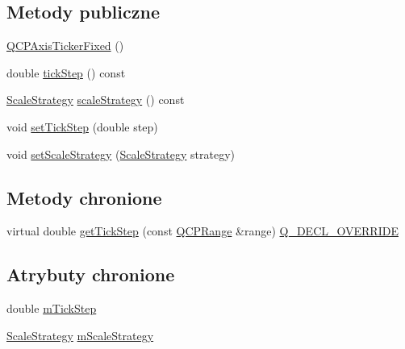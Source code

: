 \subsection*{Metody publiczne}
\begin{DoxyCompactItemize}
\item 
\hyperlink{class_q_c_p_axis_ticker_fixed_a96d2b053a15f9b8e94550c3efeff6a34}{Q\+C\+P\+Axis\+Ticker\+Fixed} ()
\item 
double \hyperlink{class_q_c_p_axis_ticker_fixed_a69e2dbe18a3fbc4108c7ea109fa5d3da}{tick\+Step} () const 
\item 
\hyperlink{class_q_c_p_axis_ticker_fixed_a15b3d38b935d404b1311eb85cfb6a439}{Scale\+Strategy} \hyperlink{class_q_c_p_axis_ticker_fixed_ab9cc237725db85b932dc6f3dd08b93fa}{scale\+Strategy} () const 
\item 
void \hyperlink{class_q_c_p_axis_ticker_fixed_a4bc83d85a4f81d4abdd3fa5042d7b833}{set\+Tick\+Step} (double step)
\item 
void \hyperlink{class_q_c_p_axis_ticker_fixed_acbc7c9bcd80b3dc3edee5f0519d301f6}{set\+Scale\+Strategy} (\hyperlink{class_q_c_p_axis_ticker_fixed_a15b3d38b935d404b1311eb85cfb6a439}{Scale\+Strategy} strategy)
\end{DoxyCompactItemize}
\subsection*{Metody chronione}
\begin{DoxyCompactItemize}
\item 
virtual double \hyperlink{class_q_c_p_axis_ticker_fixed_a9e99da01ab92a86aed415eef32fed13a}{get\+Tick\+Step} (const \hyperlink{class_q_c_p_range}{Q\+C\+P\+Range} \&range) \hyperlink{qcustomplot_8hh_a42cc5eaeb25b85f8b52d2a4b94c56f55}{Q\+\_\+\+D\+E\+C\+L\+\_\+\+O\+V\+E\+R\+R\+I\+DE}
\end{DoxyCompactItemize}
\subsection*{Atrybuty chronione}
\begin{DoxyCompactItemize}
\item 
double \hyperlink{class_q_c_p_axis_ticker_fixed_a4aeef2d3eaa57ec56f422ab1f82175d2}{m\+Tick\+Step}
\item 
\hyperlink{class_q_c_p_axis_ticker_fixed_a15b3d38b935d404b1311eb85cfb6a439}{Scale\+Strategy} \hyperlink{class_q_c_p_axis_ticker_fixed_a61ead1590161769b0d36e09419e67b10}{m\+Scale\+Strategy}
\end{DoxyCompactItemize}


